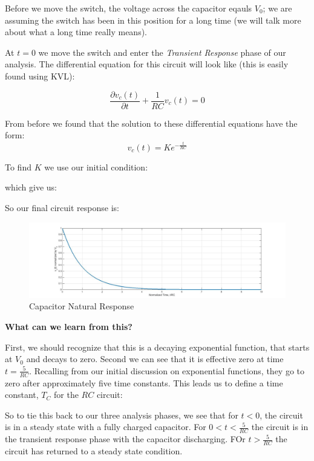 \documentclass{handout}
\begin{document}
Before we move the switch, the voltage across the capacitor eqauls $V_0$; we are assuming the switch has been in this position for a long time (we will talk more about what a long time really means).

At $t=0$ we move the switch and enter the {\em Transient Response} phase of our analysis.  The differential equation for this circuit will look like (this is easily found using KVL):

\begin{equation}
\frac{\partial v_c(t)}{\partial t} +\frac{1}{RC} v_c(t) = 0
\end{equation}

From before we found that the solution to these differential equations have the form:
\begin{equation}
v_c(t)=Ke^{-\frac{t}{RC}}
\end{equation}

To find $K$ we use our initial condition:
\soln{0.5in}{
\[
v_c(0)=V_0
\]
}

which give us:
\soln{0.5in}{
\[
K=V_0
\]
}

So our final circuit response is:
\soln{0.5in}{
\[
v_c(t)=V_0e^{-\frac{t}{RC}}
\]
}

\begin{figure} [h!]
\centering
\includegraphics[width=1\textwidth]{CapacitorNaturalResponse.jpg}
\caption{Capacitor Natural Response}
\label{fig: CapacitorNaturalResponse}
\end{figure}

\textbf{What can we learn from this?}

First, we should recognize that this is a decaying exponential function, that starts at $V_0$ and decays to zero.  Second we can see that it is effective zero at time $t=\frac{5}{RC}$.  Recalling from our initial discussion on exponential functions, they go to zero after approximately five time constants.  This leads us to define a time constant, $T_C$ for the $RC$ circuit:
\soln{0.5in}{
\[
T_C = RC
\]
}

So to tie this back to our three analysis phases, we see that for $t<0$, the circuit is in a steady state with a fully charged capacitor.  For $0<t<\frac{5}{RC}$ the circuit is in the transient response phase with the capacitor discharging.  FOr $t>\frac{5}{RC}$ the circuit has returned to a steady state condition.
\end{document}
